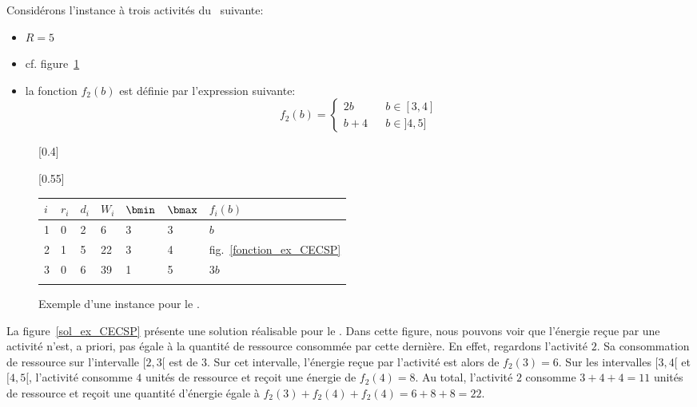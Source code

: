 \begin{ex}
Considérons l'instance à trois activités du \CECSP~suivante:
\begin{itemize}
\item $R=5$
\item cf. figure~\ref{ex_CECSP}
\item la fonction $f_2(b)$ est définie par l'expression suivante: 
\[f_2(b)=\left\{
\begin{array}{lll}
2b & & b \in [3,4]\\
b+4 & & b \in ]4,5]
\end{array}
\right.\]
\end{itemize}
\begin{figure}[!htb]
\centering
{}[0.4\linewidth]{
}
\hfill
{}[0.55\linewidth]{
  \begin{tabular}{|M{0.6cm}|M{0.6cm}M{0.6cm}M{0.6cm}M{0.6cm}M{0.6cm}M{1.2cm}|}
    \hline
    $i$ & $r_i$ & $d_i$ & $W_i$ & $\bmin$ & $\bmax$ & $f_i(b)$\\[2mm]
 & 0 & 2 & 6 & 3 & 3 & $b$\\[2mm]
    2 & 1 & 5 & 22 & 3 & 4 & fig.~\ref{fonction_ex_CECSP}\\[2mm]
    3 & 0 & 6 & 39 & 1 & 5 & $3b$\\[2mm]
    \hline
  \end{tabular}} 
\caption{Exemple d'une instance pour le \CECSP.}
\label{ex_CECSP}
\end{figure}
La figure~\ref{sol_ex_CECSP} présente une solution réalisable pour le
\CECSP. Dans cette figure, nous pouvons voir que l'énergie reçue par une
activité n'est, a priori, pas égale à la quantité de ressource
consommée par cette dernière. En effet, regardons l'activité $2$. Sa
consommation de ressource sur l'intervalle $[2,3[$ est de $3$. Sur
cet intervalle, l'énergie reçue par l'activité est alors de
$f_2(3)=6$. Sur les intervalles $[3,4[$ et $ [4,5[$, l'activité
consomme $4$ unités de ressource et reçoit une énergie de
$f_2(4)=8$. Au total, l'activité $2$ consomme $3 + 4 + 4 = 11$ unités
de ressource et reçoit une quantité d'énergie égale à $f_2(3)+ f_2(4)+
f_2(4)= 6 + 8 + 8 =22$. 


\end{ex}
